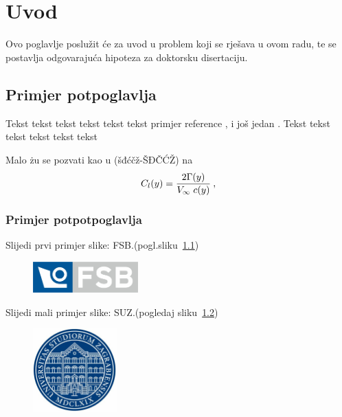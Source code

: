 \chapter{Uvod}

Ovo poglavlje poslu\v{z}it \'{c}e za uvod u problem koji se rje\v{s}ava u ovom
radu, te se postavlja odgovaraju\'{c}a hipoteza za doktorsku
disertaciju.

\section{Primjer potpoglavlja}
Tekst tekst tekst tekst tekst tekst primjer reference
\cite{mastersthesis-minimal}, i jo\v{s} jedan \cite{inbook-full}.
Tekst tekst tekst tekst tekst tekst 

Malo żu se pozvati kao u (šđćčž-ŠĐČĆŽ) na
\begin{equation}\label{eq:ls-1}
	C_l(y)=\frac{2\Gamma(y)}{\hbox{$V_{\infty}$}\;c(y)}\:,
\end{equation}
%

\subsection{Primjer potpotpoglavlja}

Slijedi prvi primjer slike: FSB.(pogl.sliku~\ref{fig1})
%

\begin{figure}[h]
  \centering
  \includegraphics[height=1.2cm]{fsb_logo_n}\\
  \label{fig1}
\end{figure}

\clearpage
Slijedi mali primjer slike: SUZ.(pogledaj sliku~\ref{fig2})
%

\begin{figure}
  \centering
  \includegraphics[height=3.2cm]{unizg_plavi_t2}\\
  \label{fig2}
\end{figure}


